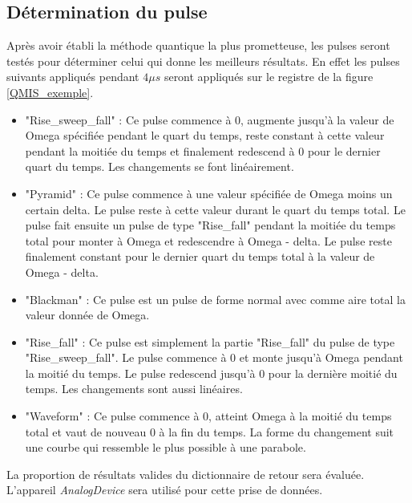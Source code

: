\documentclass[11pt]{article}
\begin{document}
\subsection{Détermination du pulse}
Après avoir établi la méthode quantique la plus prometteuse, les pulses seront testés pour déterminer celui qui donne les meilleurs résultats. En effet les pulses suivants appliqués pendant $4 \mu s$ seront appliqués sur le registre de la figure \ref{QMIS_exemple}. 
\begin{itemize}
    \item "Rise\_sweep\_fall" : Ce pulse commence à 0, augmente jusqu'à la valeur de Omega spécifiée pendant le quart du temps, reste constant à cette valeur pendant la moitiée du temps et finalement redescend à 0 pour le dernier quart du temps. Les changements se font linéairement.

    \item "Pyramid" : Ce pulse commence à une valeur spécifiée de Omega moins un certain delta. Le pulse reste à cette valeur durant le quart du temps total. Le pulse fait ensuite un pulse de type "Rise\_fall" pendant la moitiée du temps total pour monter à Omega et redescendre à Omega - delta. Le pulse reste finalement constant pour le dernier quart du temps total à la valeur de Omega - delta.
    
    \item "Blackman" : Ce pulse est un pulse de forme normal avec comme aire total la valeur donnée de Omega.

    \item "Rise\_fall" : Ce pulse est simplement la partie "Rise\_fall" du pulse de type "Rise\_sweep\_fall". Le pulse commence à 0 et monte jusqu'à Omega pendant la moitié du temps. Le pulse redescend jusqu'à 0 pour la dernière moitié du temps. Les changements sont aussi linéaires. 

    \item "Waveform" : Ce pulse commence à 0, atteint Omega à la moitié du temps total et vaut de nouveau 0 à la fin du temps. La forme du changement suit une courbe qui ressemble le plus possible à une parabole.
\end{itemize}



La proportion de résultats valides du dictionnaire de retour sera évaluée. L'appareil \textit{AnalogDevice} sera utilisé pour cette prise de données.
\end{document}
